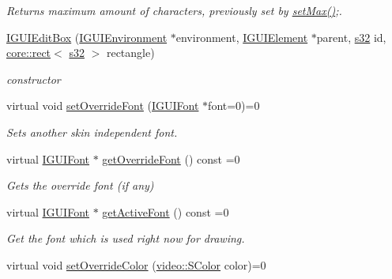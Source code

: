 \begin{DoxyCompactItemize}
\begin{DoxyCompactList}\small\item\em Returns maximum amount of characters, previously set by \hyperlink{classirr_1_1gui_1_1IGUIEditBox_a5253ed6b422e129356e56f8e2a610be5}{set\+Max()};. \end{DoxyCompactList}\item 
\mbox{\label{classirr_1_1gui_1_1IGUIEditBox_a454f49d8d569bf61b45a31871cc6d301}} 
\hyperlink{classirr_1_1gui_1_1IGUIEditBox_a454f49d8d569bf61b45a31871cc6d301}{I\+G\+U\+I\+Edit\+Box} (\hyperlink{classirr_1_1gui_1_1IGUIEnvironment}{I\+G\+U\+I\+Environment} $\ast$environment, \hyperlink{classirr_1_1gui_1_1IGUIElement}{I\+G\+U\+I\+Element} $\ast$parent, \hyperlink{namespaceirr_ac66849b7a6ed16e30ebede579f9b47c6}{s32} id, \hyperlink{classirr_1_1core_1_1rect}{core\+::rect}$<$ \hyperlink{namespaceirr_ac66849b7a6ed16e30ebede579f9b47c6}{s32} $>$ rectangle)
\begin{DoxyCompactList}\small\item\em constructor \end{DoxyCompactList}\item 
virtual void \hyperlink{classirr_1_1gui_1_1IGUIEditBox_a7608fe327ec860712ec87b5e1dc4aec9}{set\+Override\+Font} (\hyperlink{classirr_1_1gui_1_1IGUIFont}{I\+G\+U\+I\+Font} $\ast$font=0)=0
\begin{DoxyCompactList}\small\item\em Sets another skin independent font. \end{DoxyCompactList}\item 
virtual \hyperlink{classirr_1_1gui_1_1IGUIFont}{I\+G\+U\+I\+Font} $\ast$ \hyperlink{classirr_1_1gui_1_1IGUIEditBox_a4c5e6749a5ac390d6a10303babd845b8}{get\+Override\+Font} () const =0
\begin{DoxyCompactList}\small\item\em Gets the override font (if any) \end{DoxyCompactList}\item 
virtual \hyperlink{classirr_1_1gui_1_1IGUIFont}{I\+G\+U\+I\+Font} $\ast$ \hyperlink{classirr_1_1gui_1_1IGUIEditBox_a50542fa7f03a48458fac258a0949d987}{get\+Active\+Font} () const =0
\begin{DoxyCompactList}\small\item\em Get the font which is used right now for drawing. \end{DoxyCompactList}\item 
virtual void \hyperlink{classirr_1_1gui_1_1IGUIEditBox_aa134d2a36c52abcb4881da0267031c47}{set\+Override\+Color} (\hyperlink{classirr_1_1video_1_1SColor}{video\+::\+S\+Color} color)=0

\end{DoxyCompactItemize}

